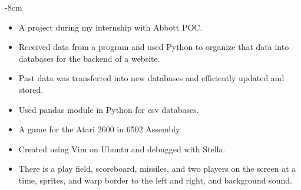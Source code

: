 \documentclass[10pt,a4paper]{altacv}
\begin{document}
\photo{6cm}{}

%

\begin{adjustwidth}{}{-8cm}
\makecvheader
\end{adjustwidth}

%


\smallskip

\bigskip



\smallskip

\begin{itemize}
  \item A project during my internship with Abbott POC.
  \item Received data from a program and used Python to organize that data into databases for the backend of a website.
  \item Past data was transferred into new databases and efficiently updated and stored.
  \item Used pandas module in Python for csv databases.
  
\end{itemize}
\divider

%

\begin{itemize}
  \item A game for the Atari 2600 in 6502 Assembly
  \item Created using Vim on Ubuntu and debugged with Stella.
  \item There is a play field, scoreboard, missiles, and two players on the screen at a time, sprites, and warp border to the left and right, and background sound.
  
\end{itemize}
\divider
\end{document}
